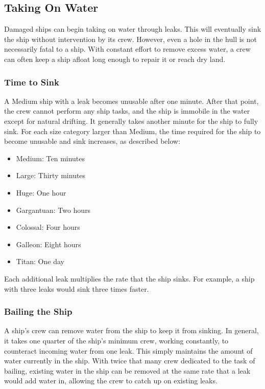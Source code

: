   \subsection{Taking On Water}\label{Taking On Water}
    Damaged ships can begin taking on water through leaks.
    This will eventually sink the ship without intervention by its crew.
    However, even a hole in the hull is not necessarily fatal to a ship.
    With constant effort to remove excess water, a crew can often keep a ship afloat long enough to repair it or reach dry land.

    \subsubsection{Time to Sink}
      A Medium ship with a leak becomes unusable after one minute.
      After that point, the crew cannot perform any ship tasks, and the ship is immobile in the water except for natural drifting.
      It generally takes another minute for the ship to fully sink.
      For each size category larger than Medium, the time required for the ship to become unusable and sink increases, as described below:
      \begin{itemize}
        \item Medium: Ten minutes
        \item Large: Thirty minutes
        \item Huge: One hour
        \item Gargantuan: Two hours
        \item Colossal: Four hours
        \item Galleon: Eight hours
        \item Titan: One day
      \end{itemize}

      Each additional leak multiplies the rate that the ship sinks.
      For example, a ship with three leaks would sink three times faster.

    \subsubsection{Bailing the Ship}
      A ship's crew can remove water from the ship to keep it from sinking.
      In general, it takes one quarter of the ship's minimum crew, working constantly, to counteract incoming water from one leak.
      This simply maintains the amount of water currently in the ship.
      With twice that many crew dedicated to the task of bailing, existing water in the ship can be removed at the same rate that a leak would add water in, allowing the crew to catch up on existing leaks.

